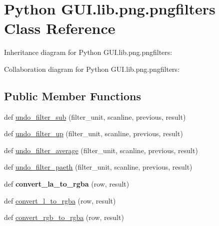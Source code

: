 \hypertarget{class_python_01_g_u_i_1_1lib_1_1png_1_1pngfilters}{}\section{Python G\+U\+I.\+lib.\+png.\+pngfilters Class Reference}
\label{class_python_01_g_u_i_1_1lib_1_1png_1_1pngfilters}


Inheritance diagram for Python G\+U\+I.\+lib.\+png.\+pngfilters\+:


Collaboration diagram for Python G\+U\+I.\+lib.\+png.\+pngfilters\+:
\subsection*{Public Member Functions}
\begin{DoxyCompactItemize}
\item 
def \hyperlink{class_python_01_g_u_i_1_1lib_1_1png_1_1pngfilters_a0d8fe71494f4f43b5f2bcf02317fa5b7}{undo\+\_\+filter\+\_\+sub} (filter\+\_\+unit, scanline, previous, result)
\item 
def \hyperlink{class_python_01_g_u_i_1_1lib_1_1png_1_1pngfilters_a4580afb72d3f0e3346f7d64606d62981}{undo\+\_\+filter\+\_\+up} (filter\+\_\+unit, scanline, previous, result)
\item 
def \hyperlink{class_python_01_g_u_i_1_1lib_1_1png_1_1pngfilters_ac48109408e73f332aa0bbbd65b78aefe}{undo\+\_\+filter\+\_\+average} (filter\+\_\+unit, scanline, previous, result)
\item 
def \hyperlink{class_python_01_g_u_i_1_1lib_1_1png_1_1pngfilters_a284208d84c5844c914bf97929e1c4f72}{undo\+\_\+filter\+\_\+paeth} (filter\+\_\+unit, scanline, previous, result)
\item 
\mbox{\label{class_python_01_g_u_i_1_1lib_1_1png_1_1pngfilters_acc2eadbbc236abcc9cd19803e74677fc}} 
def {\bfseries convert\+\_\+la\+\_\+to\+\_\+rgba} (row, result)
\item 
def \hyperlink{class_python_01_g_u_i_1_1lib_1_1png_1_1pngfilters_a0f1a9ddea6c04554ae6f8a119424b21c}{convert\+\_\+l\+\_\+to\+\_\+rgba} (row, result)
\item 
def \hyperlink{class_python_01_g_u_i_1_1lib_1_1png_1_1pngfilters_a689a011d7d9e1ab9da6fb8df6de83226}{convert\+\_\+rgb\+\_\+to\+\_\+rgba} (row, result)
\end{DoxyCompactItemize}
